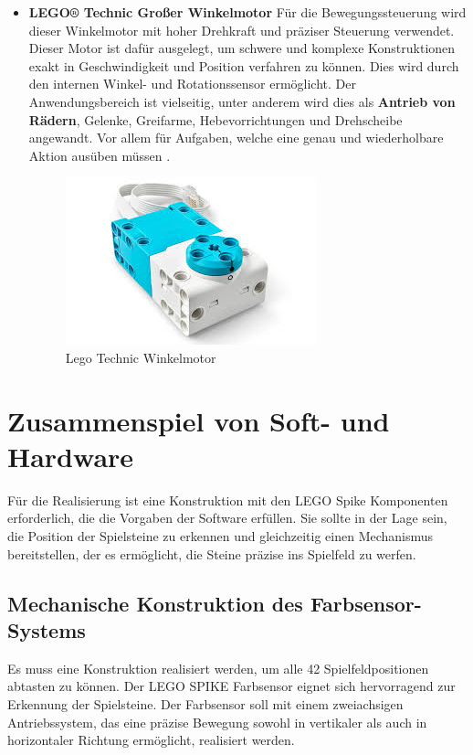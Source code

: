 \begin{itemize}
	
	\item \textbf{LEGO® Technic Großer Winkelmotor}
	Für die Bewegungssteuerung wird dieser Winkelmotor mit hoher Drehkraft und präziser Steuerung verwendet. Dieser Motor ist dafür ausgelegt, um schwere und komplexe Konstruktionen exakt in Geschwindigkeit und Position verfahren zu können. Dies wird durch den internen Winkel- und Rotationssensor ermöglicht. Der Anwendungsbereich ist vielseitig, unter anderem wird dies als \textbf{Antrieb von Rädern}, Gelenke, Greifarme, Hebevorrichtungen und Drehscheibe angewandt. Vor allem für Aufgaben, welche eine genau und wiederholbare Aktion ausüben müssen \autocites{lego_spike_prime_2023}.
	
	\begin{figure}[H]
		\centering
		\includegraphics[width=0.5\linewidth]{images/Motor}
		\caption{Lego Technic Winkelmotor}
		\label{fig:motor}
	\end{figure}
	
\end{itemize}

\section{Zusammenspiel von Soft- und Hardware}

Für die Realisierung ist eine Konstruktion mit den LEGO Spike Komponenten erforderlich, die die Vorgaben der Software erfüllen. Sie sollte in der Lage sein, die Position der Spielsteine zu erkennen und gleichzeitig einen Mechanismus bereitstellen, der es ermöglicht, die Steine präzise ins Spielfeld zu werfen.

\subsection{Mechanische Konstruktion des Farbsensor-Systems}
Es muss eine Konstruktion realisiert werden, um alle 42 Spielfeldpositionen abtasten zu können. Der LEGO SPIKE Farbsensor eignet sich hervorragend zur Erkennung der Spielsteine. Der Farbsensor soll mit einem zweiachsigen Antriebssystem, das eine präzise Bewegung sowohl in vertikaler als auch in horizontaler Richtung ermöglicht, realisiert werden.

